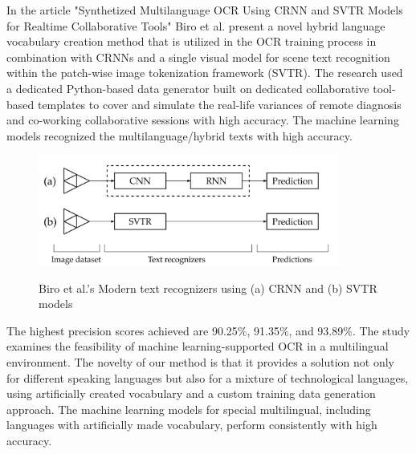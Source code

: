 In the article "Synthetized Multilanguage OCR Using CRNN and SVTR Models for Realtime Collaborative Tools" Biro et al. present a novel hybrid language vocabulary creation method that is utilized in the OCR training process in combination with CRNNs and a single visual model for scene text recognition within the patch-wise image tokenization framework (SVTR). The research used a dedicated Python-based data generator built on dedicated collaborative tool-based templates to cover and simulate the real-life variances of remote diagnosis and co-working collaborative sessions with high accuracy. The machine learning models recognized the multilanguage/hybrid texts with high accuracy.

\begin{figure}[ht]
    \centering
    \includegraphics[width=0.88\textwidth]{Figures/CRNN_Papers/Biro_2023.jpg}
    \caption[Biro et al.'s Modern Recogniser]{Biro et al.'s Modern text recognizers using (a) CRNN and (b) SVTR models}\cite{biroSynthetizedMultilanguageOCR2023}
    \label{fig:Biro et al.'s Modern text recognizers using CRNN and SVTR models}
\end{figure}


The highest precision scores achieved are 90.25\%, 91.35\%, and 93.89\%. The study examines the feasibility of machine learning-supported OCR in a multilingual environment. The novelty of our method is that it provides a solution not only for different speaking languages but also for a mixture of technological languages, using artificially created vocabulary and a custom training data generation approach. The machine learning models for special multilingual, including languages with artificially made vocabulary, perform consistently with high accuracy. \cite{biroSynthetizedMultilanguageOCR2023}



